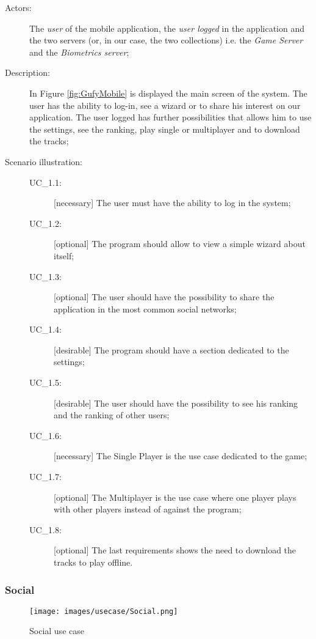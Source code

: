 \begin{description}
	\item[Actors:] The \textit{user} of the mobile application, the \textit{user logged} in the application and the two servers (or, in our case, the two collections) i.e. the \textit{Game Server} and the \textit{Biometrics server};
	\item[Description:] In Figure \ref{fig:GufyMobile} is displayed the main screen of the system. The user has the ability to log-in, see a wizard or to share his interest on our application. The user logged has further possibilities that allows him to use the settings, see the ranking, play single or multiplayer and to download the tracks;
	\item[Scenario illustration:]
	
		\begin{description}
			\item[UC\_1.1:] [necessary] The user must have the ability to log in the system;
			\item[UC\_1.2:] [optional] The program should allow to view a simple wizard about itself;
			\item[UC\_1.3:] [optional] The user should have the possibility to share the application in the most common social networks;
			\item[UC\_1.4:] [desirable] The program should have a section dedicated to the settings;
			\item[UC\_1.5:] [desirable] The user should have the possibility to see his ranking and the ranking of other users;
			\item[UC\_1.6:] [necessary] The Single Player is the use case dedicated to the game;
			\item[UC\_1.7:] [optional] The Multiplayer is the use case where one player plays with other players instead of against the program;
			\item[UC\_1.8:] [optional] The last requirements shows the need to download the tracks to play offline.
		\end{description}

\end{description}

\subsubsection{Social}
\label{sec:social}
\begin{figure}[H]
\centering %
\texttt{[image: images/usecase/Social.png]}
\caption{Social use case}
\label{fig:SocialMobileUseCase}
\end{figure}

